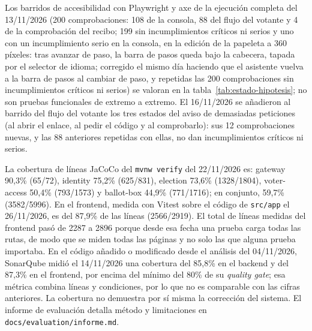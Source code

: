 Los barridos de accesibilidad con Playwright y axe de la ejecución completa
del 13/11/2026 (200
comprobaciones: 108 de la consola, 88 del flujo del votante y 4 de la
comprobación del recibo; 199 sin incumplimientos críticos ni serios y uno con
un incumplimiento serio en la consola, en la edición de la papeleta a 360
píxeles: tras avanzar de paso, la barra de pasos queda bajo la cabecera, tapada
por el selector de idioma; corregido el mismo día haciendo que el asistente
vuelva a la barra de pasos al cambiar de paso, y repetidas las 200
comprobaciones sin incumplimientos críticos ni serios) se valoran en la
tabla~\ref{tab:estado-hipotesis}; no son pruebas funcionales de extremo a
extremo. El 16/11/2026 se añadieron al barrido del flujo del votante los tres
estados del aviso de demasiadas peticiones (al abrir el enlace, al pedir el
código y al comprobarlo): sus 12 comprobaciones nuevas, y las 88 anteriores
repetidas con ellas, no dan incumplimientos críticos ni serios.

La cobertura de líneas JaCoCo del \texttt{mvnw verify} del 22/11/2026 es:
gateway 90,3\% (65/72), identity 75,2\% (625/831), election 73,6\%
(1328/1804), voter-access 50,4\% (793/1573) y ballot-box 44,9\% (771/1716);
en conjunto, 59,7\% (3582/5996). En el frontend, medida con Vitest sobre el
código de \texttt{src/app} el 26/11/2026, es del 87,9\% de las líneas
(2566/2919). El total de líneas medidas del frontend pasó de 2287 a 2896
porque desde esa fecha una prueba carga todas las rutas, de modo que se miden
todas las páginas y no solo las que alguna prueba importaba. En el código añadido o modificado desde el análisis del
04/11/2026, SonarQube midió el 14/11/2026 una cobertura del
85,8\% en el backend y del 87,3\% en el frontend, por encima del mínimo del
80\% de su \emph{quality gate}; esa métrica combina líneas y condiciones, por
lo que no es comparable con las cifras anteriores. La cobertura no demuestra por sí
misma la corrección del sistema. El informe de evaluación detalla método y
limitaciones en \texttt{docs/evaluation/informe.md}.


